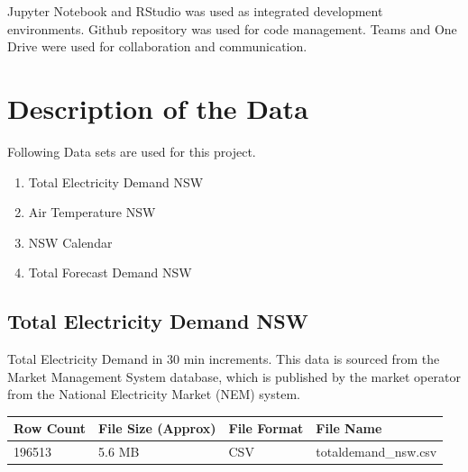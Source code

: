 \documentclass[mstat,12pt]{unswthesis}
\begin{document}
Jupyter Notebook and RStudio was used as integrated development
environments. Github repository was used for code management. Teams and
One Drive were used for collaboration and communication.

\section{Description of the Data}\label{description-of-the-data}

Following Data sets are used for this project.

\begin{enumerate}
    \item Total Electricity Demand NSW
    \item Air Temperature NSW
    \item NSW Calendar
    \item Total Forecast Demand NSW
\end{enumerate}

\subsection{Total Electricity Demand
NSW}\label{total-electricity-demand-nsw}

Total Electricity Demand in 30 min increments. This data is sourced from
the Market Management System database, which is published by the market
operator from the National Electricity Market (NEM) system.

\begin{table}[h]
\tiny
\begin{tabular}{@{}|l|l|l|l|@{}}
\toprule
\textbf{Row Count} & \textbf{File Size (Approx)} & \textbf{File Format} & \textbf{File Name}   \\ \midrule
196513             & 5.6 MB                      & CSV                  & totaldemand\_nsw.csv \\ \bottomrule
\end{tabular}
\end{table}
\end{document}
